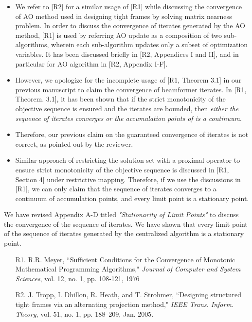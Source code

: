 \begin{enumerate}
	\begin{itemize}
		\item We refer to [R2] for a similar usage of [R1] while discussing the convergence of \ac{AO} method used in designing tight frames by solving matrix nearness problem. In order to discuss the convergence of iterates generated by the \ac{AO} method, [R1] is used by referring \ac{AO} update as a composition of two sub-algorithms, wherein each sub-algorithm updates only a subset of optimization variables. It has been discussed briefly in [R2, Appendices I and II], and in particular for \ac{AO} algorithm in [R2, Appendix I-F].
		\item However, we apologize for the incomplete usage of [R1, Theorem 3.1] in our previous manuscript to claim the convergence of beamformer iterates. In [R1, Theorem. 3.1], it has been shown that if the strict monotonicity of the objective sequence is ensured and the iterates are bounded, then \textit{either the sequence of iterates converges or the accumulation points of  is a continuum}.
		\item Therefore, our previous claim on the guaranteed convergence of iterates is not correct, as pointed out by the reviewer. 
		\item Similar approach of restricting the solution set with a proximal operator to ensure strict monotonicity of the objective sequence is discussed in [R1, Section 4] under restrictive mapping. Therefore, if we use the discussions in [R1], we can only claim that the sequence of iterates  converges to a continuum of accumulation points, and every limit point is a stationary point.
	\end{itemize}
	
	We have revised Appendix A-D titled \textit{"Stationarity of Limit Points"} to discuss the convergence of the sequence of iterates. We have shown that every limit point of the sequence of iterates generated by the centralized algorithm is a stationary point.
	
	\vspace{1eM}
	\begin{itemize}		
		\item[R1.] R.R. Meyer, ``Sufficient Conditions for the Convergence of Monotonic Mathematical Programming Algorithms," \emph{Journal of Computer and System Sciences}, vol. 12, no. 1, pp. 108-121, 1976
		\item[R2.] J. Tropp, I. Dhillon, R. Heath, and T. Strohmer, ``Designing structured tight frames via an alternating projection method," \emph{IEEE Trans. Inform. Theory}, vol. 51, no. 1, pp. 188–209, Jan. 2005.
	\end{itemize}
	
\end{enumerate}